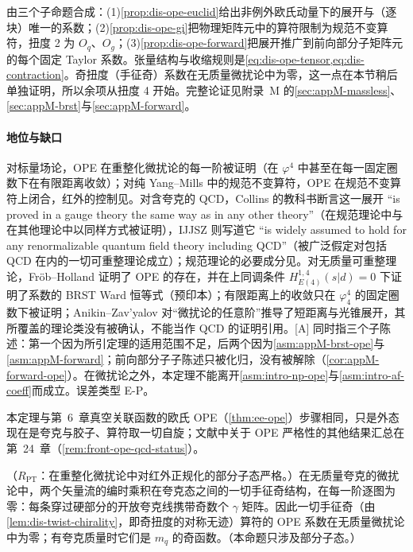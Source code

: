 \begin{proofsketch}
由三个子命题合成：(1)\cref{prop:dis-ope-euclid}给出非例外欧氏动量下的展开与（逐块）唯一的系数；(2)\cref{prop:dis-ope-gi}把物理矩阵元中的算符限制为规范不变算符，扭度 2 为 $O_q$、$O_g$；(3)\cref{prop:dis-ope-forward}把展开推广到前向部分子矩阵元的每个固定 Taylor 系数。张量结构与收缩规则是\cref{eq:dis-ope-tensor,eq:dis-contraction}。奇扭度（手征奇）系数在无质量微扰论中为零，这一点在本节稍后单独证明，所以余项从扭度 4 开始。完整论证见附录~M 的\cref{sec:appM-massless}、\cref{sec:appM-brst}与\cref{sec:appM-forward}。
\end{proofsketch}

\paragraph{地位与缺口}
对标量场论，OPE 在重整化微扰论的每一阶被证明\cite{Zimmermann1973,Zimmermann:1972te,Zimmermann1970}（在 $\varphi^4$ 中甚至在每一固定圈数下在有限距离收敛\cite{Hollands:2011gf,Holland:2014pna}）；对纯 Yang--Mills 中的规范不变算符，OPE 在规范不变算符上闭合\cite{Hollands:2007zg}，红外的控制见\cite{Frob:2015uqy}。对含夸克的 QCD，Collins 的教科书断言这一展开 “is proved in a gauge theory the same way as in any other theory”\cite[第~12.8~节]{Collins1984}（在规范理论中与在其他理论中以同样方式被证明），IJJSZ 则写道它 “is widely assumed to hold for any renormalizable quantum field theory including QCD”\cite[第~II~节]{IzubuchiEtAl2018}（被广泛假定对包括 QCD 在内的一切可重整理论成立）；规范理论的必要成分见\cite{Joglekar:1976eb,Joglekar:1976pe}。对无质量可重整理论，Fröb--Holland 证明了 OPE 的存在，并在上同调条件 $H^{1,4}_{E(4)}(s|d)=0$ 下证明了系数的 BRST Ward 恒等式（预印本）\cite{Frob:2016mzv}；有限距离上的收敛只在 $\varphi^4_4$ 的固定圈数下被证明；Anikin--Zav'yalov 对“微扰论的任意阶”推导了短距离与光锥展开\cite{Anikin:1978tj}，其所覆盖的理论类没有被确认，不能当作 QCD 的证明引用。[A] 同时指三个子陈述：第一个因为所引定理的适用范围不足，后两个因为\cref{asm:appM-brst-ope}与\cref{asm:appM-forward}；前向部分子子陈述只被化归，没有被解除（\cref{cor:appM-forward-ope}）。在微扰论之外，本定理不能离开\cref{asm:intro-np-ope}与\cref{asm:intro-af-coeff}而成立。误差类型 E-P。

本定理与第~6~章真空关联函数的欧氏 OPE（\cref{thm:ee-ope}）步骤相同，只是外态现在是夸克与胶子、算符取一切自旋；文献中关于 OPE 严格性的其他结果汇总在第~24~章（\cref{rem:front-ope-qcd-status}）。

\begin{proposition}\label{prop:dis-chiral-suppression}
（$R_{\mathrm{PT}}$：在重整化微扰论中对红外正规化的部分子态严格。）在无质量夸克的微扰论中，两个矢量流的编时乘积在夸克态之间的一切手征奇结构，在每一阶逐图为零：每条穿过硬部分的开放夸克线携带奇数个 $\gamma$ 矩阵。因此一切手征奇（由\cref{lem:dis-twist-chirality}，即奇扭度的对称无迹）算符的 OPE 系数在无质量微扰论中为零；有夸克质量时它们是 $m_q$ 的奇函数。（本命题只涉及部分子态。）
\end{proposition}

